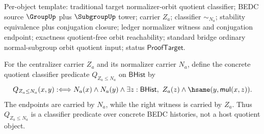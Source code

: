 Per-object template: traditional target normalizer-orbit quotient classifier;
BEDC source $\GroupUp$ plus $\SubgroupUp$ tower; carrier $Z_a$; classifier
$\sim_{N_a}$; stability equivalence plus conjugation closure; ledger normalizer
witness and conjugation endpoint; exactness quotient-free orbit reachability;
standard bridge ordinary normal-subgroup orbit quotient input; status
$\mathsf{ProofTarget}$.

\begin{definition}
\label{def:centralizer-normalizer-quotient-classifier}
For the centralizer carrier $Z_a$ and its normalizer carrier $N_a$, define
the concrete quotient classifier predicate $Q_{Z_a\leq N_a}$ on
$\mathsf{BHist}$ by
$$
Q_{Z_a\leq N_a}(x,y)
:\Longleftrightarrow
N_a(x)\land N_a(y)\land
\exists z:\mathsf{BHist},\ Z_a(z)\land
\hsame(y,\mathsf{mul}(x,z)).
$$
The endpoints are carried by $N_a$, while the right witness is carried by
$Z_a$. Thus $Q_{Z_a\leq N_a}$ is a classifier predicate over concrete BEDC
histories, not a host quotient object.
\end{definition}

